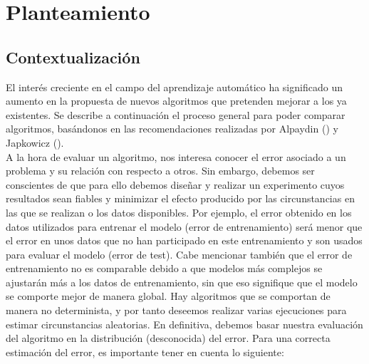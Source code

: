 \chapter*{Planteamiento}
\setcounter{page}{1}

\section*{Contextualización}
	
	El interés creciente en el campo del aprendizaje
automático ha significado un aumento en la propuesta
de nuevos algoritmos que pretenden mejorar a los 
ya existentes. Se describe a continuación el proceso
general para poder comparar algoritmos, basándonos en
las recomendaciones realizadas por Alpaydin 
(\cite{Alpaydin:2010:IML:1734076}) y Japkowicz  
(\cite{DBLP:books/cu/Japkowicz2011}).\\
	A la hora de evaluar un algoritmo,
nos interesa conocer el error asociado a un problema y 
su relación con respecto a otros. Sin embargo, debemos ser 
conscientes de que para ello debemos diseñar y realizar un 
experimento cuyos resultados sean fiables y minimizar el 
efecto producido por las circunstancias en las que se 
realizan o los datos disponibles. Por ejemplo, el error 
obtenido en los datos utilizados para entrenar el modelo 
(error de entrenamiento) será menor que el error en unos 
datos que no han participado en este entrenamiento y son 
usados para evaluar el modelo (error de test). Cabe mencionar 
también que el error de entrenamiento no es comparable debido 
a que modelos más complejos se ajustarán más a los datos de 
entrenamiento, sin que eso signifique que el modelo se 
comporte mejor de manera global. Hay algoritmos que se 
comportan de manera no determinista, y por tanto deseemos 
realizar varias ejecuciones para estimar circunstancias 
aleatorias. En definitiva, debemos basar nuestra evaluación 
del algoritmo en la distribución (desconocida) del error. 
Para una correcta estimación del error,  es importante tener 
en cuenta lo siguiente:
	
